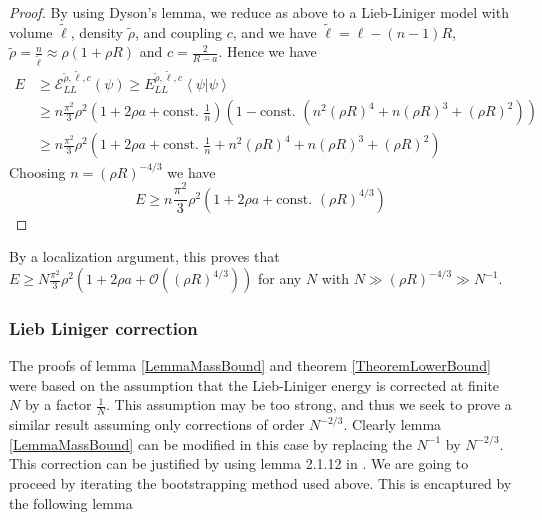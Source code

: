 \documentclass[a4paper,11pt]{article}
\renewcommand{\braket}[1]{\left\langle#1\right\rangle}
\numberwithin{equation}{section}
\begin{document}
	\begin{proof}
		By using Dyson's lemma, we reduce as above to a Lieb-Liniger model with volume $ \tilde{\ell} $, density $ \tilde{\rho} $, and coupling $ c $, and we have $ \tilde{\ell}=\ell-(n-1)R $, $ \tilde{\rho}=\frac{n}{\tilde{\ell}}\approx\rho (1+\rho R) $ and $ c=\frac{2}{R-a} $. Hence we have \begin{equation}
		\begin{aligned}
		E&\geq \mathcal{E}_{LL}^{\tilde{\rho},\tilde{\ell},c}(\psi)\geq E_{LL}^{\tilde{\rho},\tilde{\ell},c}\braket{\psi|\psi}\\&\geq
		n\frac{\pi^2}{3}\rho^2\left(1+2\rho a+\text{const. }\frac{1}{n}\right)\left(1-\text{const. }\left(n^2(\rho R)^{4}+n(\rho R)^3+(\rho R)^2\right)\right)\\
		&\geq n\frac{\pi^2}{3}\rho^2\left(1+2\rho a+\text{const. }\frac{1}{n}+n^2(\rho R)^4+n(\rho R)^{3}+(\rho R)^2\right)
		\end{aligned}
		\end{equation}
		Choosing $ n=(\rho R)^{-4/3} $ we have \begin{equation}
		E\geq n\frac{\pi^2}{3}\rho^2\left(1+2\rho a+\text{const. }(\rho R)^{4/3}\right)
		\end{equation}
	\end{proof}
	By a localization argument, this proves that $ E\geq N\frac{\pi^2}{3}\rho^2\left(1+2\rho a+\mathcal{O}\left((\rho R)^{4/3}\right)\right) $ for any $ N $ with $ N\gg (\rho R)^{-4/3}\gg N^{-1} $.
	
	\subsubsection{Lieb Liniger correction}
	The proofs of lemma \ref{LemmaMassBound} and theorem \ref{TheoremLowerBound} were based on the assumption that the Lieb-Liniger energy is corrected at finite $N$ by a factor $\frac1N$. This assumption may be too strong, and thus we seek to prove a similar result assuming only corrections of order $N^{-2/3}$. Clearly lemma \ref{LemmaMassBound} can be modified in this case by replacing the $N^{-1}$ by $N^{-2/3}$. This correction can be justified by using lemma 2.1.12 in \cite{robinson2014thermodynamic}. We are going to proceed by iterating the bootstrapping method used above. This is encaptured by the following lemma
	
\end{document}
